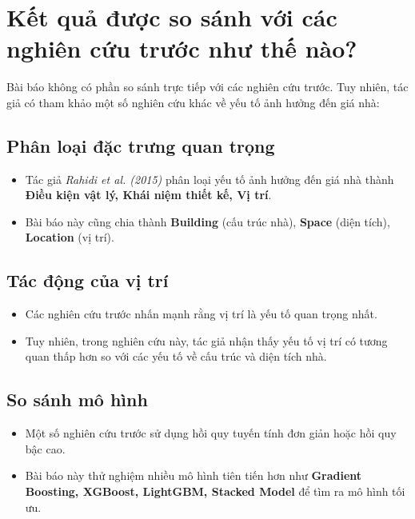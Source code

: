 \section{Kết quả được so sánh với các nghiên cứu trước như thế nào?}
Bài báo không có phần so sánh trực tiếp với các nghiên cứu trước. Tuy nhiên, tác giả có tham khảo một số nghiên cứu khác về yếu tố ảnh hưởng đến giá nhà:

\subsection{Phân loại đặc trưng quan trọng}
\begin{itemize}
    \item Tác giả \textit{Rahidi et al. (2015)} phân loại yếu tố ảnh hưởng đến giá nhà thành \textbf{Điều kiện vật lý, Khái niệm thiết kế, Vị trí}.
    \item Bài báo này cũng chia thành \textbf{Building} (cấu trúc nhà), \textbf{Space} (diện tích), \textbf{Location} (vị trí).
\end{itemize}

\subsection{Tác động của vị trí}
\begin{itemize}
    \item Các nghiên cứu trước nhấn mạnh rằng vị trí là yếu tố quan trọng nhất.
    \item Tuy nhiên, trong nghiên cứu này, tác giả nhận thấy yếu tố vị trí có tương quan thấp hơn so với các yếu tố về cấu trúc và diện tích nhà.
\end{itemize}

\subsection{So sánh mô hình}
\begin{itemize}
    \item Một số nghiên cứu trước sử dụng hồi quy tuyến tính đơn giản hoặc hồi quy bậc cao.
    \item Bài báo này thử nghiệm nhiều mô hình tiên tiến hơn như \textbf{Gradient Boosting, XGBoost, LightGBM, Stacked Model} để tìm ra mô hình tối ưu.
\end{itemize}
